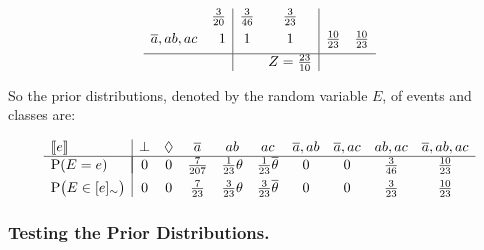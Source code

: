 \documentclass[adraft,copyright,creativecommons]{eptcs}
\newcommand{\at}[1]{\ensuremath{\!\del{#1}}}
\newcommand{\co}[1]{\ensuremath{\overline{#1}}}
\newcommand{\stablecore}[1]{\ensuremath{\left\llbracket #1 \right\rrbracket}}
\newcommand{\pr}[1]{\ensuremath{\mathrm{P}\at{#1}}}
\newcommand{\class}[1]{\ensuremath{[{#1}]_{\sim}}}
\newcommand{\inconsistent}{\bot}
\newcommand{\indepclass}{\ensuremath{\Diamond}}
\begin{document}
\begin{description}
\begin{equation*}
\begin{array}{lr|cc|cc}
                   & \frac{3}{20}
                   & \frac{3}{46}
                   & \frac{3}{23}
                  \\[4pt]
                  \co{a}, ab, ac
                   & 1
                   & 1
                   & 1
                   & \frac{10}{23}
                   & \frac{10}{23}
                  \\[4pt]
                  \hline
                   &
                   &
                   & Z = \frac{23}{10}
                   &
              \end{array}
          \end{equation*}
\end{description}

So the prior distributions, denoted by the random variable $E$, of events and classes are:

\begin{equation}
    \begin{array}{l|ccccccccc}
        \stablecore{e}          &
        \inconsistent           &
        \indepclass             &
        \co{a}                  &
        ab                      &
        ac                      &
        \co{a}, ab              &
        \co{a}, ac              &
        ab, ac                  &
        \co{a}, ab, ac
        \\ \hline\\[-12pt]

        \pr{E = e}              &
        0                       &
        0                       &
        \frac{7}{207}           &
        \frac{1}{23}\theta      &
        \frac{1}{23}\co{\theta} &
        0                       &
        0                       &
        \frac{3}{46}            &
        \frac{10}{23}
        \\[4pt]

        \pr{E \in \class{e}}    &
        0                       &
        0                       &
        \frac{7}{23}            &
        \frac{3}{23}\theta      &
        \frac{3}{23}\co{\theta} &
        0                       &
        0                       &
        \frac{3}{23}            &
        \frac{10}{23}
    \end{array}\label{eq:sbf.prior}
\end{equation}
%
%
%
\subsubsection*{Testing the Prior Distributions.}
%
%
%
\end{document}
